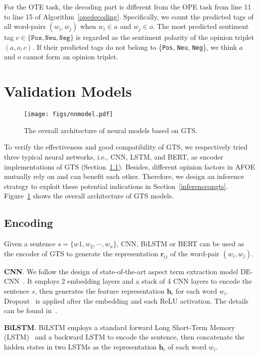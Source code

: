 \documentclass[11pt,a4paper]{article}
\begin{document}
For the OTE task, the decoding part is different from the OPE task from line 11 to line 15 of Algorithm~\ref{opedecoding}. Specifically, we count the predicted tags of all word-pairs $(w_i, w_j)$ when $w_i\in a$ and $w_j \in o$. The most predicted sentiment tag $c\in \{\texttt{Pos}, \texttt{Neu}, \texttt{Neg}\}$ is regarded as the sentiment polarity of the opinion triplet $(a, o, c)$. If their predicted tags do not belong to \{\texttt{Pos}, \texttt{Neu}, \texttt{Neg}\}, we think $a$ and $o$ cannot form an opinion triplet.

\section{Validation Models}
\label{validationmodels}
\begin{figure}[t]
	\centering
	\texttt{[image: figs/nnmodel.pdf]}
	\caption{The overall architecture of neural models based on GTS.}
	\label{model}
\end{figure} 

To verify the effectiveness and good compatibility of GTS, we respectively tried three typical neural networks, i.e., CNN, LSTM, and BERT, as encoder implementations of GTS (Section~\ref{encoding}). Besides, different opinion factors in AFOE mutually rely on and can benefit each other. Therefore, we design an inference strategy to exploit these potential indications in Section~\ref{inferenceongts}. Figure~\ref{model} shows the overall architecture of GTS models.

\subsection{Encoding}
\label{encoding}
Given a sentence $s=\{w1, w_2, \cdots, w_n\}$, CNN, BiLSTM or BERT can be used as the encoder of GTS to generate the representation $\mathbf{r}_{ij}$ of the word-pair $(w_i, w_j)$.

\textbf{CNN}. We follow the design of state-of-the-art aspect term extraction model DE-CNN~\cite{DBLP:conf/acl/XuLSY18}. It employs 2 embedding layers and a stack of 4 CNN layers to encode the sentence $s$, then generates the feature representation $\mathbf{h}_i$ for each word $w_i$. Dropout~\cite{DBLP:journals/jmlr/SrivastavaHKSS14} is applied after the embedding and each ReLU activation. The details can be found in~. 

\textbf{BiLSTM}. BiLSTM employs a standard forward Long Short-Term Memory (LSTM)~\cite{DBLP:journals/neco/HochreiterS97} and a backward LSTM to encode the sentence, then concatenate the hidden states in two LSTMs as the representation $\mathbf{h}_i$ of each word $w_i$.
\end{document}
